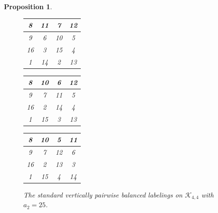 \documentclass[10pt, reqno]{amsart}
\theoremstyle{definition}
\theoremstyle{plain}
\newtheorem{proposition}[definition]{Proposition}
\begin{document}
\begin{proposition}
\begin{figure}[hbt!]
    \centering
    \begin{tabular}{|c|c|c|c|} \hline
       8  &11  &7  &12  \\  \hline
        9  &6   &10   &5  \\  \hline
       16  &3   &15  &4  \\  \hline
        1  &14  &2   &13  \\  \hline
    \end{tabular}
\hspace{0.15in} \begin{tabular}{|c|c|c|c|} \hline
       8  &10 &6  &12  \\  \hline
        9  &7   &11   &5  \\  \hline
       16  &2   &14  &4  \\  \hline
        1  &15  &3   &13  \\  \hline
    \end{tabular}
\hspace{0.15in}  \begin{tabular}{|c|c|c|c|} \hline
       8  &10  &5  &11  \\  \hline
        9  &7   &12   &6  \\  \hline
       16  &2   &13  &3  \\  \hline
        1  &15  &4   &14  \\  \hline
    \end{tabular}
    \caption{The standard vertically pairwise balanced labelings on
    $\mathcal{K}_{4,4}$ with $a_2=25$.}
    \label{fig:StandVertLabelsA2=25}
\end{figure}
\end{proposition}
\end{document}
